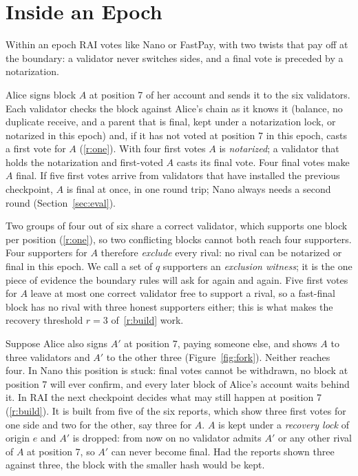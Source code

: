 \section{Inside an Epoch}
\label{sec:epoch}
Within an epoch RAI votes like Nano or FastPay, with two twists that pay off at the boundary: a validator never switches sides, and a final vote is preceded by a notarization.

Alice signs block $A$ at position 7 of her account and sends it to the six validators. Each validator checks the block against Alice's chain as it knows it (balance, no duplicate receive, and a parent that is final, kept under a notarization lock, or notarized in this epoch) and, if it has not voted at position 7 in this epoch, casts a first vote for $A$ (\ref{r:one}). With four first votes $A$ is \emph{notarized}; a validator that holds the notarization and first-voted $A$ casts its final vote. Four final votes make $A$ final. If five first votes arrive from validators that have installed the previous checkpoint, $A$ is final at once, in one round trip; Nano always needs a second round (Section~\ref{sec:eval}).

Two groups of four out of six share a correct validator, which supports one block per position (\ref{r:one}), so two conflicting blocks cannot both reach four supporters. Four supporters for $A$ therefore \emph{exclude} every rival: no rival can be notarized or final in this epoch. We call a set of $q$ supporters an \emph{exclusion witness}; it is the one piece of evidence the boundary rules will ask for again and again. Five first votes for $A$ leave at most one correct validator free to support a rival, so a fast-final block has no rival with three honest supporters either; this is what makes the recovery threshold $r=3$ of~\ref{r:build} work.

Suppose Alice also signs $A'$ at position 7, paying someone else, and shows $A$ to three validators and $A'$ to the other three (Figure~\ref{fig:fork}). Neither reaches four. In Nano this position is stuck: final votes cannot be withdrawn, no block at position 7 will ever confirm, and every later block of Alice's account waits behind it. In RAI the next checkpoint decides what may still happen at position 7 (\ref{r:build}). It is built from five of the six reports, which show three first votes for one side and two for the other, say three for $A$. $A$ is kept under a \emph{recovery lock} of origin $e$ and $A'$ is dropped: from now on no validator admits $A'$ or any other rival of $A$ at position 7, so $A'$ can never become final. Had the reports shown three against three, the block with the smaller hash would be kept.

